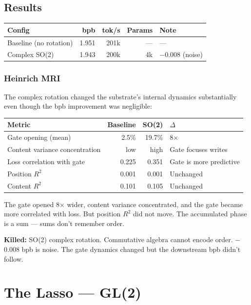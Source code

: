 \documentclass[11pt,a4paper]{report}
\newcommand{\killed}[1]{\textcolor{killed}{\textbf{Killed:}} #1}
\begin{document}
\section{Results}

\begin{center}
\begin{tabular}{lrrrl}
\toprule
Config & bpb & tok/s & Params & Note \\
\midrule
Baseline (no rotation) & 1.951 & 201k & --- & --- \\
Complex SO(2) & 1.943 & 200k & 4k & $-$0.008 (noise) \\
\bottomrule
\end{tabular}
\end{center}

\subsection{Heinrich MRI}

The complex rotation changed the substrate's internal dynamics substantially even though the bpb improvement was negligible:

\begin{center}
\begin{tabular}{lrrl}
\toprule
Metric & Baseline & SO(2) & $\Delta$ \\
\midrule
Gate opening (mean) & 2.5\% & 19.7\% & 8$\times$ \\
Content variance concentration & low & high & Gate focuses writes \\
Loss correlation with gate & 0.225 & 0.351 & Gate is more predictive \\
Position $R^2$ & 0.001 & 0.001 & Unchanged \\
Content $R^2$ & 0.101 & 0.105 & Unchanged \\
\bottomrule
\end{tabular}
\end{center}

The gate opened 8$\times$ wider, content variance concentrated, and the gate became more correlated with loss. But position $R^2$ did not move. The accumulated phase is a sum --- sums don't remember order.

\killed{SO(2) complex rotation. Commutative algebra cannot encode order. $-$0.008 bpb is noise. The gate dynamics changed but the downstream bpb didn't follow.}


\chapter{The Lasso --- GL(2)}
\end{document}
